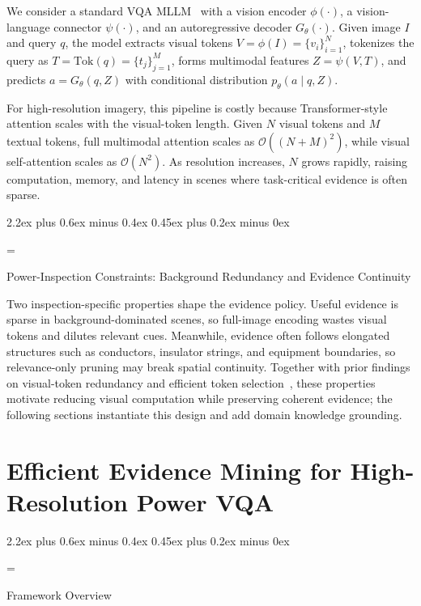 \documentclass[journal,twoside,web]{ieeecolor}
\makeatletter
\renewcommand{\subsection}{\@startsection{subsection}{2}{\z@}%
  {2.2ex plus 0.6ex minus 0.4ex}%
  {0.45ex plus 0.2ex minus 0ex}%
  {\color{myorange}\normalsize\normalfont\everymath={\sf}\sf\itshape\raggedright}}
\makeatother
\begin{document}
We consider a standard VQA MLLM~\cite{dosovitskiy2021image, liu2021swin, blip2, llava} with a vision encoder $\phi(\cdot)$, a vision-language connector $\psi(\cdot)$, and an autoregressive decoder $G_\theta(\cdot)$.
Given image $I$ and query $q$, the model extracts visual tokens $V=\phi(I)=\{v_i\}_{i=1}^{N}$, tokenizes the query as $T=\mathrm{Tok}(q)=\{t_j\}_{j=1}^{M}$, forms multimodal features $Z=\psi(V,T)$, and predicts $a=G_{\theta}(q,Z)$ with conditional distribution $p_{\theta}(a\mid q,Z)$.

For high-resolution imagery, this pipeline is costly because Transformer-style attention scales with the visual-token length.
Given $N$ visual tokens and $M$ textual tokens, full multimodal attention scales as $\mathcal{O}((N+M)^2)$, while visual self-attention scales as $\mathcal{O}(N^2)$.
As resolution increases, $N$ grows rapidly, raising computation, memory, and latency in scenes where task-critical evidence is often sparse.


\subsection{Power-Inspection Constraints: Background Redundancy and Evidence Continuity}
\label{sec:power_constraints}

Two inspection-specific properties shape the evidence policy.
Useful evidence is sparse in background-dominated scenes, so full-image encoding wastes visual tokens and dilutes relevant cues.
Meanwhile, evidence often follows elongated structures such as conductors, insulator strings, and equipment boundaries, so relevance-only pruning may break spatial continuity.
Together with prior findings on visual-token redundancy and efficient token selection~\cite{dynamicvit, tome}, these properties motivate reducing visual computation while preserving coherent evidence; the following sections instantiate this design and add domain knowledge grounding.

\section{Efficient Evidence Mining for High-Resolution Power VQA}
\label{sec:method}

\subsection{Framework Overview}
\label{sec:method_overview}
\end{document}
